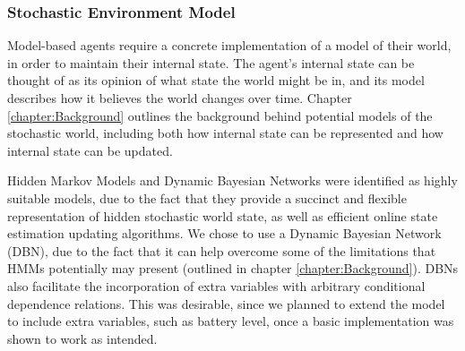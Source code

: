 \subsubsection{Stochastic Environment Model}
\workinprogress
Model-based agents require a concrete implementation of a model of their world, in order to maintain their internal state. The agent's internal state can be thought of as its opinion of what state the world might be in, and its model describes how it believes the world changes over time. Chapter \ref{chapter:Background} outlines the background behind potential models of the stochastic world, including both how internal state can be represented and how internal state can be updated.\par
Hidden Markov Models and Dynamic Bayesian Networks were identified as highly suitable models, due to the fact that they provide a succinct and flexible representation of hidden stochastic world state, as well as efficient online state estimation updating algorithms. We chose to use a Dynamic Bayesian Network (DBN), due to the fact that it can help overcome some of the limitations that HMMs potentially may present (outlined in chapter \ref{chapter:Background}). DBNs also facilitate the incorporation of extra variables with arbitrary conditional dependence relations. This was desirable, since we planned to extend the model to include extra variables, such as battery level, once a basic implementation was shown to work as intended.

